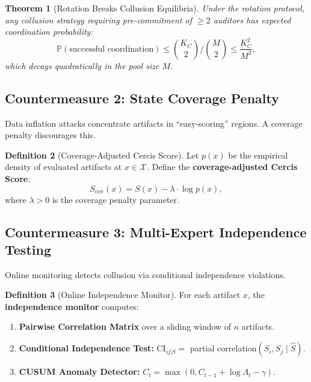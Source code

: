 \documentclass[11pt,a4paper]{article}
\theoremstyle{plain}
\newtheorem{theorem}{Theorem}[section]
\theoremstyle{definition}
\newtheorem{definition}[theorem]{Definition}
\theoremstyle{remark}
\newcommand{\bbP}{\mathbb{P}}
\newcommand{\cX}{\mathcal{X}}
\begin{document}
\begin{theorem}[Rotation Breaks Collusion Equilibria]\label{thm:rotation}
  Under the rotation protocol, any collusion strategy requiring pre-commitment of
  \(\geq 2\) auditors has expected coordination probability:
  \[ \bbP(\text{successful coordination}) \leq \binom{K_C}{2} \Big/ \binom{M}{2} \leq \frac{K_C^2}{M^2}, \]
  which decays quadratically in the pool size \(M\).
\end{theorem}

\subsection{Countermeasure 2: State Coverage Penalty}
Data inflation attacks concentrate artifacts in ``easy-scoring'' regions. A coverage penalty discourages this.

\begin{definition}[Coverage-Adjusted Cercis Score]\label{def:coverage}
  Let \(p(x)\) be the empirical density of evaluated artifacts at \(x \in \cX\).
  Define the \textbf{coverage-adjusted Cercis Score}:
  \begin{equation}\label{eq:scov}
    S_{\text{cov}}(x) = S(x) - \lambda \cdot \log p(x),
  \end{equation}
  where \(\lambda > 0\) is the coverage penalty parameter.
\end{definition}

\subsection{Countermeasure 3: Multi-Expert Independence Testing}
Online monitoring detects collusion via conditional independence violations.

\begin{definition}[Online Independence Monitor]\label{def:monitor}
  For each artifact \(x\), the \textbf{independence monitor} computes:
  \begin{enumerate}[label=\textbf{M\arabic*}, leftmargin=*]
    \item \textbf{Pairwise Correlation Matrix} over a sliding window of \(n\) artifacts.
    \item \textbf{Conditional Independence Test:} \(\text{CI}_{ij|S} =\) partial correlation\((S_i, S_j \mid \hat{S})\).
    \item \textbf{CUSUM Anomaly Detector:} \(C_t = \max(0, C_{t-1} + \log \Lambda_t - \gamma)\).
  \end{enumerate}
\end{definition}
\end{document}
